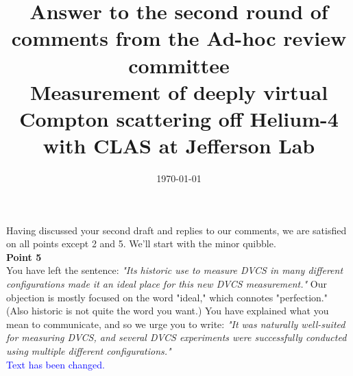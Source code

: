 \documentclass[a4paper,11pt,twoside]{article}
\title{Answer to the second round of comments from the Ad-hoc review committee \\
 Measurement of deeply virtual Compton
scattering off Helium-4 with CLAS at Jefferson Lab}
\date{\today}
\begin{document}
\maketitle

\section*{}
Having discussed your second draft and replies to our comments, we are satisfied on all points except 2 and 5.
We'll start with the minor quibble. \\

\textbf{Point 5} \\
You have left the sentence: \textit{"Its historic use to measure DVCS in many different configurations made it an ideal
place for this new DVCS measurement."} Our objection is mostly focused on the word "ideal," which connotes
"perfection." (Also historic is not quite the word you want.) You have explained what you mean to communicate,
and so we urge you to write: \textit{"It was naturally well-suited for measuring DVCS, and several DVCS experiments
were successfully conducted using multiple different configurations."} \\
   \textcolor{blue}{Text has been changed.}
\end{document}
